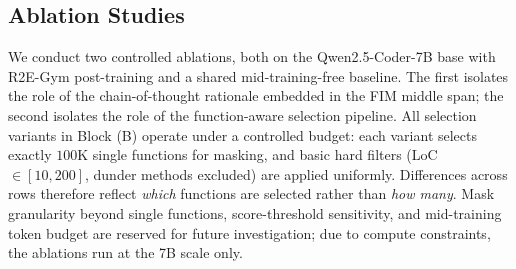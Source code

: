 \subsection{Ablation Studies}
\label{sec:exp:ablation}

We conduct two controlled ablations, both on the Qwen2.5-Coder-7B base
with R2E-Gym post-training and a shared mid-training-free baseline. The
first isolates the role of the chain-of-thought rationale embedded in the
FIM middle span; the second isolates the role of the function-aware
selection pipeline. All selection variants in Block (B) operate under a
controlled budget: each variant selects exactly $100$K single functions
for masking, and basic hard filters (LoC $\in [10, 200]$, dunder methods
excluded) are applied uniformly. Differences across rows therefore reflect
\emph{which} functions are selected rather than \emph{how many}. Mask
granularity beyond single functions, score-threshold sensitivity, and
mid-training token budget are reserved for future investigation; due to
compute constraints, the ablations run at the 7B scale only.

